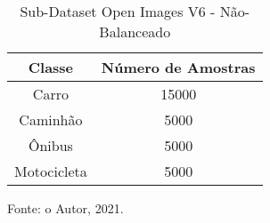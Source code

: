 \begin{table}[htp]
\centering
\caption{Sub-Dataset Open Images V6 - Não-Balanceado}
\label{tab:daer_dataset_openimages}
{%
\begin{tabular}{cc}
\hline
\textbf{Classe} & \textbf{Número de Amostras} \\ \hline
Carro           & 15000                       \\
Caminhão        & 5000                        \\
Ônibus          & 5000                        \\
Motocicleta     & 5000                        \\ \hline
\end{tabular}%

Fonte: o Autor, 2021.
}
\end{table}